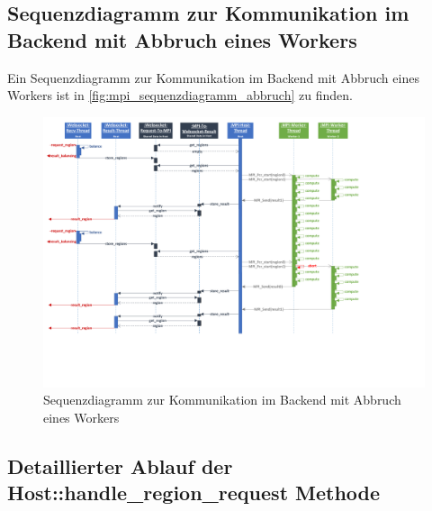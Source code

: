 \begin{figure}[h]
	
\end{figure}

\begin{figure}
	
\end{figure}

\subsection{Sequenzdiagramm zur Kommunikation im Backend mit Abbruch eines Workers}

Ein Sequenzdiagramm zur Kommunikation im Backend mit Abbruch eines Workers ist in \autoref{fig:mpi_sequenzdiagramm_abbruch} zu finden.

\begin{landscape}
    \begin{figure}
        \centering
        \includegraphics[origin = c, trim = 0mm 40mm 60mm 0mm, clip, width=0.9\linewidth]{img/Implementierung/MPISequenzdiagrammAbbruchFarben.pdf}
        \caption{Sequenzdiagramm zur Kommunikation im Backend mit Abbruch eines Workers}
        \label{fig:mpi_sequenzdiagramm_abbruch}
    \end{figure}
\end{landscape}

\subsection{Detaillierter Ablauf der Host::handle\_region\_request Methode}

